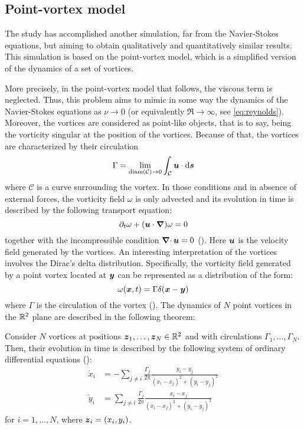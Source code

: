 \documentclass[../main.tex]{subfiles}
\begin{document}
\subsection{Point-vortex model}
The study has accomplished another simulation, far from the Navier-Stokes equations, but aiming to obtain qualitatively and quantitatively similar results. This simulation is based on the point-vortex model, which is a simplified version of the dynamics of a set of vortices.

More precisely, in the point-vortex model that follows, the viscous term is neglected. Thus, this problem aims to mimic in some way the dynamics of the Navier-Stokes equations as $\nu \to 0$ (or equivalently $\Re\to\infty$, see \cref{eq:reynolds}). Moreover, the vortices are considered as point-like objects, that is to say, being the vorticity singular at the position of the vortices. Because of that, the vortices are characterized by their circulation
\begin{equation}
	\Gamma = \lim_{\operatorname{diam}(\mathcal{C})\to 0} \int_{\mathcal{C}} \boldsymbol{u} \cdot \dd{\boldsymbol{s}}
\end{equation}
where $\mathcal{C}$ is a curve surrounding the vortex. In those conditions and in absence of external forces, the vorticity field $\omega$ is only advected and its evolution in time is described by the following transport equation:
\begin{equation}
	\partial_t \omega + (\boldsymbol{u} \cdot \grad) \omega = 0
\end{equation}
together with the incompressible condition $\operatorname{\boldsymbol{\nabla}\cdot} \boldsymbol{u}=0$ (\cite{pointvortexmath}). Here $\boldsymbol{u}$ is the velocity field generated by the vortices. An interesting interpretation of the vortices involves the Dirac's delta distribution. Specifically, the vorticity field generated by a point vortex located at $\boldsymbol{y}$ can be represented as a distribution of the form:
\begin{equation}\label{eq:vorticity_delta}
	\omega(\boldsymbol{x}, t) = \Gamma \delta(\boldsymbol{x}-\boldsymbol{y})
\end{equation}
where $\Gamma$ is the circulation of the vortex (\cite{Saffman}). The dynamics of $N$ point vortices in the $\mathbb{R}^2$ plane are described in the following theorem:
\\
\begin{theorem}
	Consider $N$ vortices at positions $\boldsymbol{z}_1,\ldots,\boldsymbol{z}_N\in \mathbb{R}^2$ and with circulations $\Gamma_1,\ldots,\Gamma_N$. Then, their evolution in time is described by the following system of ordinary differential equations (\cite{pointvortex}):
	\begin{align}
		\dot{x}_i & = -\sum_{j\neq i} \frac{\Gamma_j}{2\pi} \frac{y_i-y_j}{{(x_i-x_j)}^2+{(y_i-y_j)}^2} \\
		\dot{y}_i & = \sum_{j\neq i} \frac{\Gamma_j}{2\pi} \frac{x_i-x_j}{{(x_i-x_j)}^2+{(y_i-y_j)}^2}
	\end{align}
	for $i=1,\ldots,N$, where $\boldsymbol{z}_i=(x_i,y_i)$.
\end{theorem}
\end{document}
